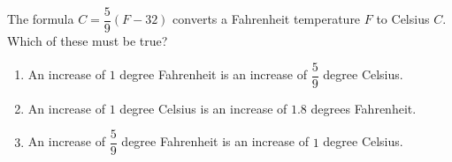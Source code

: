 The formula $C=\dfrac{5}{9}(F-32)$ converts a Fahrenheit temperature $F$ to Celsius $C$. Which of these must be true?
\begin{enumerate}
\item[I.] An increase of $1$ degree Fahrenheit is an increase of $\dfrac{5}{9}$ degree Celsius.
\item[II.] An increase of $1$ degree Celsius is an increase of $1.8$ degrees Fahrenheit.
\item[III.] An increase of $\dfrac{5}{9}$ degree Fahrenheit is an increase of $1$ degree Celsius.
\end{enumerate}

